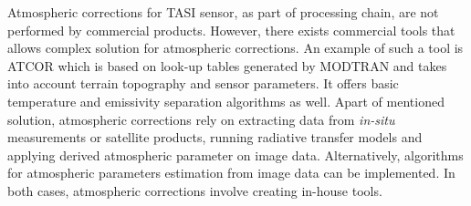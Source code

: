 Atmospheric corrections for TASI sensor, as part of processing chain, are not performed by commercial products. However, there exists commercial tools that allows complex solution for atmospheric corrections. An example of such a tool is ATCOR \cite{RS02} which is based on look-up tables generated by MODTRAN and takes into account terrain topography and sensor parameters. It offers basic temperature and emissivity separation algorithms as well. Apart of mentioned solution, atmospheric corrections rely on extracting data from \textit{in-situ} measurements or satellite products, running radiative transfer models and applying derived atmospheric parameter on image data. Alternatively, algorithms for atmospheric parameters estimation from image data can be implemented. In both cases, atmospheric corrections involve creating in-house tools.

